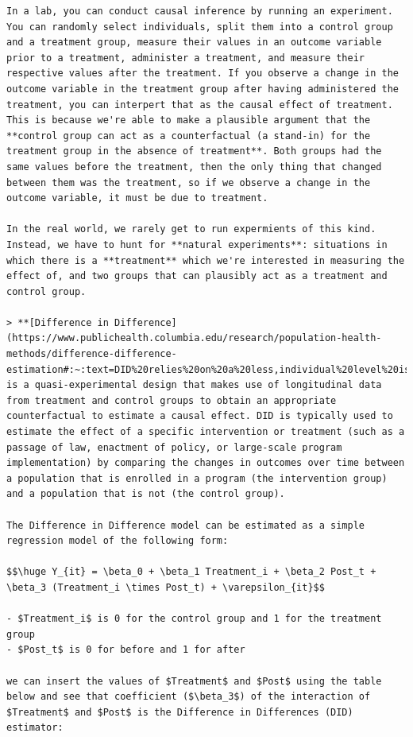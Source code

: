 \documentclass[
  letterpaper,
  DIV=11,
  numbers=noendperiod]{scrreprt}
\begin{document}
\begin{verbatim}
In a lab, you can conduct causal inference by running an experiment. You can randomly select individuals, split them into a control group and a treatment group, measure their values in an outcome variable prior to a treatment, administer a treatment, and measure their respective values after the treatment. If you observe a change in the outcome variable in the treatment group after having administered the treatment, you can interpert that as the causal effect of treatment. This is because we're able to make a plausible argument that the **control group can act as a counterfactual (a stand-in) for the treatment group in the absence of treatment**. Both groups had the same values before the treatment, then the only thing that changed between them was the treatment, so if we observe a change in the outcome variable, it must be due to treatment.

In the real world, we rarely get to run expermients of this kind. Instead, we have to hunt for **natural experiments**: situations in which there is a **treatment** which we're interested in measuring the effect of, and two groups that can plausibly act as a treatment and control group. 

> **[Difference in Difference](https://www.publichealth.columbia.edu/research/population-health-methods/difference-difference-estimation#:~:text=DID%20relies%20on%20a%20less,individual%20level%20is%20not%20possible.)** is a quasi-experimental design that makes use of longitudinal data from treatment and control groups to obtain an appropriate counterfactual to estimate a causal effect. DID is typically used to estimate the effect of a specific intervention or treatment (such as a passage of law, enactment of policy, or large-scale program implementation) by comparing the changes in outcomes over time between a population that is enrolled in a program (the intervention group) and a population that is not (the control group).

The Difference in Difference model can be estimated as a simple regression model of the following form: 

$$\huge Y_{it} = \beta_0 + \beta_1 Treatment_i + \beta_2 Post_t + \beta_3 (Treatment_i \times Post_t) + \varepsilon_{it}$$

- $Treatment_i$ is 0 for the control group and 1 for the treatment group
- $Post_t$ is 0 for before and 1 for after

we can insert the values of $Treatment$ and $Post$ using the table below and see that coefficient ($\beta_3$) of the interaction of $Treatment$ and $Post$ is the Difference in Differences (DID) estimator:


\end{verbatim}
\end{document}
